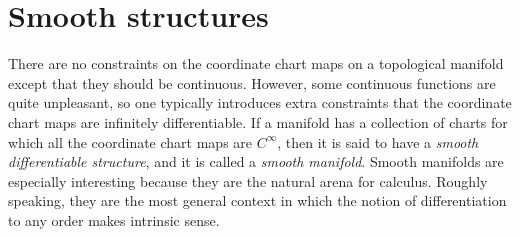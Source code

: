 \begin{example}
    
\end{example}


\section{Smooth structures}

There are no constraints on the coordinate chart maps on a topological manifold except that they should be continuous. However, some continuous functions are quite unpleasant, so one typically introduces extra constraints that the coordinate chart maps are infinitely differentiable. If a manifold has a collection of charts for which all the coordinate chart maps are $C^\infty$, then it is said to have a \emph{smooth differentiable structure}, and it is called a \emph{smooth manifold}. Smooth manifolds are especially interesting because they are the natural arena for calculus. Roughly speaking, they are the most general context in which the notion of differentiation to any order makes intrinsic sense.

\begin{comment}
\begin{definition}[Atlas]
    A \emph{$C^\infty$-atlas} (or an \emph{atlas}) on a locally Euclidean space $M$ is a collection $\mathfrak{A} = \{(U_\alpha, \varphi_\alpha)\}$ of pairwise $C^\infty$-compatible charts that cover $M$, i.e., such that $M = \bigcup_{\alpha}U_\alpha$.
\end{definition}

\begin{lemma}
    Let $\{(U_\alpha, \varphi_\alpha)\}$ be an atlas on a locally Euclidean space. If two charts $(V, \varrho)$ and $(W, \psi)$ are both compatible with the atlas $\{(U_\alpha, \varphi_\alpha)\}$, then they are compatible with each other.
\end{lemma}

\begin{proof}
    Let $p \in V \cap W$. We need to show that $\psi \circ \varrho^{-1}$ is $C^\infty$ at $\varrho(p)$. Since $\{(U_\alpha, \varphi_\alpha)\}$ is an atlas for $M$, $p \in U_\alpha$ for some $\alpha$. Then $p \in U_\alpha \cap V \cap W$.
\end{proof}
\end{comment}

